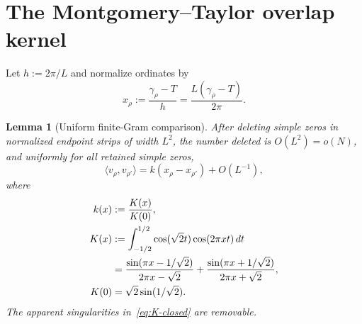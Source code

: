 \documentclass[11pt]{article}
\newtheorem{lemma}[theorem]{Lemma}
\begin{document}
\section{The Montgomery--Taylor overlap kernel}\label{sec:kernel}

Let $h:=2\pi/L$ and normalize ordinates by
\[
 x_\rho:=\frac{\gamma_\rho-T}{h}
 =\frac{L(\gamma_\rho-T)}{2\pi}.
\]

\begin{lemma}[Uniform finite-Gram comparison]\label{lem:kernel-limit}
After deleting simple zeros in normalized endpoint strips of width $L^2$,
the number deleted is $O(L^2)=o(N)$, and uniformly for all retained simple
zeros,
\begin{equation}\label{eq:kernel-limit}
 \langle v_\rho,v_{\rho'}\rangle
 =k(x_\rho-x_{\rho'})+O(L^{-1}),
\end{equation}
where
\begin{align}
 k(x)&:=\frac{K(x)}{K(0)},\label{eq:k-def}\\
 K(x)&:=\int_{-1/2}^{1/2}
 \cos(\sqrt2t)\cos(2\pi xt)\,dt\notag\\
 &=\frac{\sin(\pi x-1/\sqrt2)}{2\pi x-\sqrt2}
 +\frac{\sin(\pi x+1/\sqrt2)}{2\pi x+\sqrt2},\label{eq:K-closed}\\
 K(0)&=\sqrt2\sin(1/\sqrt2).\notag
\end{align}
The apparent singularities in~\eqref{eq:K-closed} are removable.
\end{lemma}
\end{document}
